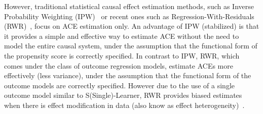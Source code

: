 \documentclass[letterpaper]{article} %
\begin{document}
However, traditional statistical causal effect estimation methods, such as Inverse Probability Weighting (IPW)~\cite{Rosenbaum1983propensityscoreipw, hernan2009ipw} or recent ones such as Regression-With-Residuals (RWR)~\cite{wodtke2020rwr}, focus on ACE estimation only. An advantage of IPW (stabilized) is that it provides a simple and effective way to estimate ACE without the need to model the entire causal system, under the assumption that the functional form of the propensity score is correctly specified. In contrast to IPW, RWR, which comes under the class of outcome regression models, estimate ACEs more effectively (less variance), under the assumption that the functional form of the outcome models are correctly specified. 
However due to the use of a single outcome model similar to S(Single)-Learner, RWR provides biased estimates when there is effect modification in data (also know as effect heterogeneity)~\cite{vanderweele2009distinctionheterogeneity}.  
\end{document}
